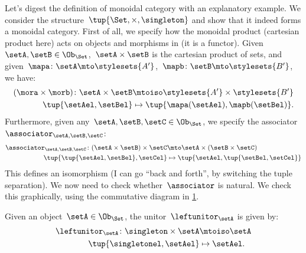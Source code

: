 \begin{example}
    Let's digest the definition of monoidal category with an explanatory example.
    We consider the structure~$\tup{\Set,\times,\singleton}$ and show that it indeed forms a monoidal category.
    First of all, we specify how the monoidal product (cartesian product here) acts on objects and morphisms in \Set (it is a functor).
    Given~$\setA,\setB\in \Ob_{\Set}$,~$\setA\times \setB$ is the cartesian product of sets, and given~$\mapa\colon \setA\mto \stylesets{A'}$,~$\mapb\colon \setB\mto \stylesets{B'}$, we have:
    \begin{equation*}
        \label{eq:set_mon_prod_2}
        \begin{aligned}
        (\mora \times \morb)
            \colon \setA\times \setB&\mtoiso \stylesets{A'}\times \stylesets{B'}\\
            \tup{\setAel,\setBel}&\mapsto \tup{\mapa(\setAel),\mapb(\setBel)}.
        \end{aligned}
    \end{equation*}
    Furthermore, given any~$\setA,\setB,\setC\in \Ob_{\Set}$, we specify the associator~$\associator_{\setA,\setB,\setC}$:
    \begin{equation*}
        \label{eq:set_mon_prod_3}
        \begin{aligned}
            \associator_{\setA,\setB,\setC}\colon (\setA\times \setB)\times \setC&\mto \setA\times (\setB\times \setC)\\
            \tup{\tup{\setAel,\setBel},\setCel}&\mapsto \tup{\setAel,\tup{\setBel,\setCel}}
        \end{aligned}
    \end{equation*}
    This defines an isomorphism (I can go ``back and forth'', by switching the tuple separation).
    We now need to check whether~$\associator$ is natural.
    We check this graphically, using the commutative diagram in \cref{fig:monoidal_set_ass_nat}.
    
    \begin{figure}[h!]
        \centering
        \caption{}
        \label{fig:monoidal_set_ass_nat}
    \end{figure}
    
    Given an object~$\setA\in \Ob_\Set$, the unitor~$\leftunitor_\setA$ is given by:
    \begin{equation*}
        \label{eq:set_mon_prod_4}
        \begin{aligned}
            \leftunitor_\setA\colon \singleton \times \setA &\mtoiso \setA\\
            \tup{\singletonel,\setAel}&\mapsto \setAel.
        \end{aligned}
    \end{equation*}
    

\end{example}
